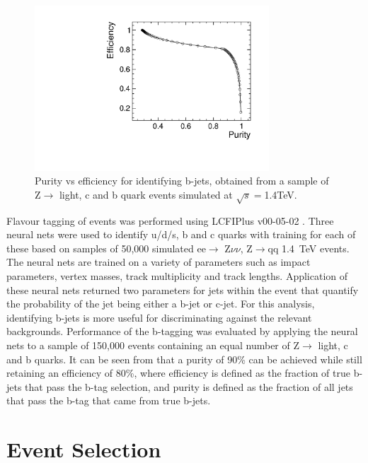 \begin{figure}
  \centering
  \includegraphics[width=0.78\textwidth,keepaspectratio]{HiggsAnalysis/figures/updatedpurityvsefficiency.pdf}
  \caption[B-Tagging Purity vs Efficiency]{Purity vs efficiency for identifying b-jets, obtained from a sample of Z$\rightarrow$ light, c and b quark events simulated at $\sqrt{s}=$1.4TeV.}
  \label{btag}
\end{figure}

Flavour tagging of events was performed using LCFIPlus v00-05-02 \cite{Suehara:2015ura}. Three neural nets were used to identify u/d/s, b and c quarks with training for each of these based on samples of 50,000 simulated ee$\rightarrow$ Z$\nu\nu$, Z$\rightarrow$qq 1.4~TeV events. The neural nets are trained on a variety of parameters such as impact parameters, vertex masses, track multiplicity and  track lengths. Application of these neural nets returned two parameters for jets within the event that quantify the probability of the jet being either a b-jet or c-jet. For this analysis, identifying b-jets is more useful for discriminating against the relevant backgrounds. Performance of the b-tagging was evaluated by applying the neural nets to a sample of 150,000 events containing an equal number of Z$\rightarrow$ light, c and b quarks. It can be seen from  that a purity of 90\% can be achieved while still retaining an efficiency of 80\%, where efficiency is defined as the fraction of true b-jets that pass the b-tag selection, and purity is defined as the fraction of all jets that pass the b-tag that came from true b-jets.

\section{Event Selection}


